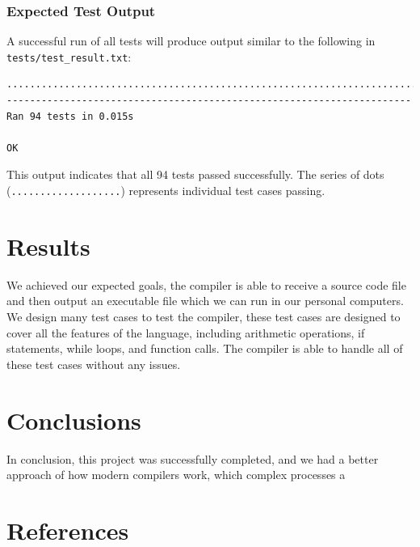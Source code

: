 \documentclass[12pt, letterpaper]{article}
\begin{document}
\subsubsection*{Expected Test Output}
A successful run of all tests will produce output similar to the following in \texttt{tests/test\_result.txt}:

\begin{lstlisting}[language={}, basicstyle=\ttfamily\footnotesize, frame=none, breaklines=true]
..............................................................................................
----------------------------------------------------------------------
Ran 94 tests in 0.015s

OK
\end{lstlisting}

This output indicates that all 94 tests passed successfully. The series of dots (\texttt{...................}) represents individual test cases passing.
\section{Results}

We achieved our expected goals, the compiler is able to receive a source code file and then output an executable file which we can run in our personal computers.
We design many test cases to test the compiler, these test cases are designed to cover all the features of the language, including arithmetic operations, if statements, while loops, and function calls. The compiler is able to handle all of these test cases without any issues.



\section{Conclusions}

In conclusion, this project was successfully completed, and we had a better approach of how modern compilers work, which complex processes a
\section{References}

\end{document}
